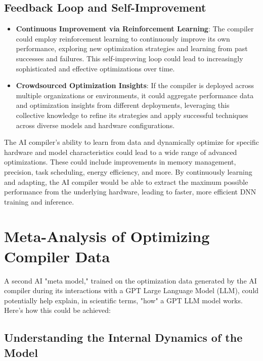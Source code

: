\documentclass{article}
\begin{document}
\subsection{Feedback Loop and Self-Improvement}
\begin{itemize}
    \item \textbf{Continuous Improvement via Reinforcement Learning}: The compiler could employ reinforcement learning to continuously improve its own performance, exploring new optimization strategies and learning from past successes and failures. This self-improving loop could lead to increasingly sophisticated and effective optimizations over time.
    \item \textbf{Crowdsourced Optimization Insights}: If the compiler is deployed across multiple organizations or environments, it could aggregate performance data and optimization insights from different deployments, leveraging this collective knowledge to refine its strategies and apply successful techniques across diverse models and hardware configurations.
\end{itemize}


The AI compiler’s ability to learn from data and dynamically optimize for specific hardware and model characteristics could lead to a wide range of advanced optimizations. These could include improvements in memory management, precision, task scheduling, energy efficiency, and more. By continuously learning and adapting, the AI compiler would be able to extract the maximum possible performance from the underlying hardware, leading to faster, more efficient DNN training and inference.

\section{Meta-Analysis of Optimizing Compiler Data}
A second AI "meta model," trained on the optimization data generated by the AI compiler during its interactions with a GPT Large Language Model (LLM), could potentially help explain, in scientific terms, "how" a GPT LLM model works. Here’s how this could be achieved:

\subsection{Understanding the Internal Dynamics of the Model}
\end{document}
